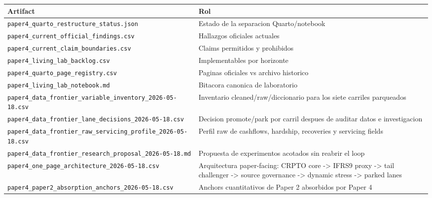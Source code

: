 \documentclass[
  spanish,
  11pt,
  letterpaper,
]{scrbook}
\newcounter{none} %
\theoremstyle{plain}
\theoremstyle{remark}
\begin{document}
{\def\LTcaptype{none} %
\begin{longtable}[]{@{}
  >{\raggedright\arraybackslash}p{}
  >{\raggedright\arraybackslash}p{}@{}}
\toprule\noalign{}
\begin{minipage}[b]{\linewidth}\raggedright
Artifact
\end{minipage} & \begin{minipage}[b]{\linewidth}\raggedright
Rol
\end{minipage} \\
\midrule\noalign{}
\endhead
\bottomrule\noalign{}
\endlastfoot
\texttt{paper4\_quarto\_restructure\_status.json} & Estado de la
separacion Quarto/notebook \\
\texttt{paper4\_current\_official\_findings.csv} & Hallazgos oficiales
actuales \\
\texttt{paper4\_current\_claim\_boundaries.csv} & Claims permitidos y
prohibidos \\
\texttt{paper4\_living\_lab\_backlog.csv} & Implementables por
horizonte \\
\texttt{paper4\_quarto\_page\_registry.csv} & Paginas oficiales vs
archivo historico \\
\texttt{paper4\_living\_lab\_notebook.md} & Bitacora canonica de
laboratorio \\
\texttt{paper4\_data\_frontier\_variable\_inventory\_2026-05-18.csv} &
Inventario cleaned/raw/diccionario para los siete carriles parqueados \\
\texttt{paper4\_data\_frontier\_lane\_decisions\_2026-05-18.csv} &
Decision promote/park por carril despues de auditar datos e
investigacion \\
\texttt{paper4\_data\_frontier\_raw\_servicing\_profile\_2026-05-18.csv}
& Perfil raw de cashflows, hardship, recoveries y servicing fields \\
\texttt{paper4\_data\_frontier\_research\_proposal\_2026-05-18.md} &
Propuesta de experimentos acotados sin reabrir el loop \\
\texttt{paper4\_one\_page\_architecture\_2026-05-18.csv} & Arquitectura
paper-facing: CRPTO core -\textgreater{} IFRS9 proxy -\textgreater{}
tail challenger -\textgreater{} source governance -\textgreater{}
dynamic stress -\textgreater{} parked lanes \\
\texttt{paper4\_paper2\_absorption\_anchors\_2026-05-18.csv} & Anchors
cuantitativos de Paper 2 absorbidos por Paper 4 \\

\end{longtable}}
\end{document}
